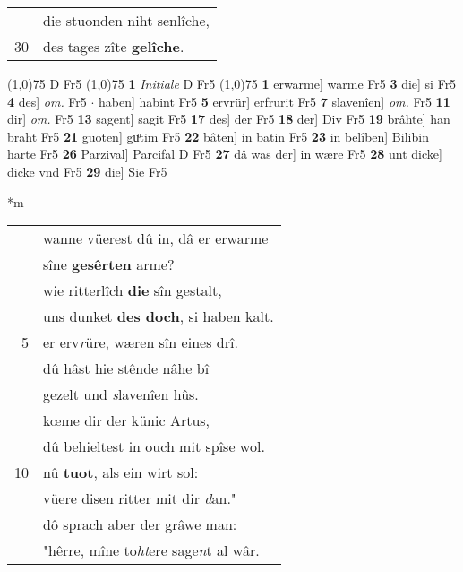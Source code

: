 \documentclass[8pt,a4paper,notitlepage]{article}
\begin{document}
\begin{table}[ht]
\begin{minipage}[t]{0.5\linewidth}
\begin{tabular}{rl}
 & die stuonden niht senlîche,\\ 
30 & des tages zîte \textbf{gelîche}.\\ 
\end{tabular}
\scriptsize
\line(1,0){75} \newline
D Fr5 \newline
\line(1,0){75} \newline
\textbf{1} \textit{Initiale} D Fr5  \newline
\line(1,0){75} \newline
\textbf{1} erwarme] warme Fr5 \textbf{3} die] si Fr5 \textbf{4} des] \textit{om.} Fr5  $\cdot$ haben] habint Fr5 \textbf{5} ervrür] erfrurit Fr5 \textbf{7} slavenîen] \textit{om.} Fr5 \textbf{11} dir] \textit{om.} Fr5 \textbf{13} sagent] sagit Fr5 \textbf{17} des] der Fr5 \textbf{18} der] Div Fr5 \textbf{19} brâhte] han braht Fr5 \textbf{21} guoten] guͦtim Fr5 \textbf{22} bâten] in batin Fr5 \textbf{23} in belîben] Bilibin harte Fr5 \textbf{26} Parzival] Parcifal D Fr5 \textbf{27} dâ was der] in wære Fr5 \textbf{28} unt dicke] dicke vnd Fr5 \textbf{29} die] Sie Fr5 \newline
\end{minipage}
\hspace{0.5cm}
\begin{minipage}[t]{0.5\linewidth}
\small
\begin{center}*m
\end{center}
\begin{tabular}{rl}
 & wanne vüerest dû in, dâ er erwarme\\ 
 & sîne \textbf{gesêrten} arme?\\ 
 & wie ritterlîch \textbf{die} sîn gestalt,\\ 
 & uns dunket \textbf{des doch}, si haben kalt.\\ 
5 & er erv\textit{r}üre, wæren sîn eines drî.\\ 
 & dû hâst hie stênde nâhe bî\\ 
 & gezelt und \textit{s}lavenîen hûs.\\ 
 & kœme dir der künic Artus,\\ 
 & dû behieltest in ouch mit spîse wol.\\ 
10 & nû \textbf{tuot}, als ein wirt sol:\\ 
 & vüere disen ritter mit dir \textit{d}an."\\ 
 & dô sprach aber der grâwe man:\\ 
 & "hêrre, mîne to\textit{ht}ere sage\textit{n}t al wâr.\\ 

\end{tabular}
\end{minipage}
\end{table}
\end{document}
